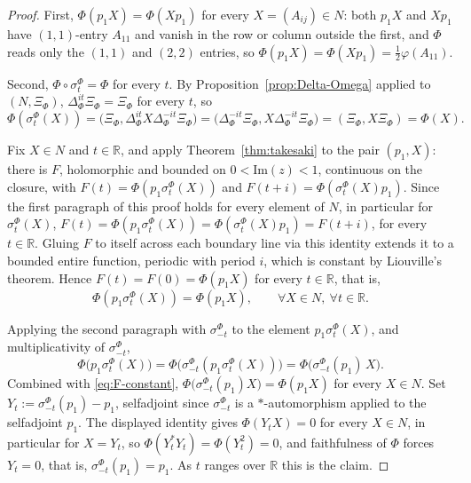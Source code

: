 \begin{proof}
	First, $\Phi(p_1X) = \Phi(Xp_1)$ for every $X=(A_{ij}) \in N$: both $p_1X$ and $Xp_1$ have $(1,1)$-entry $A_{11}$ and vanish in the row or column outside the first, and $\Phi$ reads only the $(1,1)$ and $(2,2)$ entries, so $\Phi(p_1X)=\Phi(Xp_1)=\tfrac12\varphi(A_{11})$.
	
	Second, $\Phi \circ \sigma_t^\Phi = \Phi$ for every $t$. By Proposition~\ref{prop:Delta-Omega} applied to $(N,\Xi_\Phi)$, $\Delta_\Phi^{it}\Xi_\Phi = \Xi_\Phi$ for every $t$, so
	\[
	\Phi(\sigma_t^\Phi(X)) = \big(\Xi_\Phi, \Delta_\Phi^{it}X\Delta_\Phi^{-it}\Xi_\Phi\big) = \big(\Delta_\Phi^{-it}\Xi_\Phi, X\Delta_\Phi^{-it}\Xi_\Phi\big) = (\Xi_\Phi,X\Xi_\Phi) = \Phi(X).
	\]
	
	Fix $X \in N$ and $t \in \mathbb{R}$, and apply Theorem~\ref{thm:takesaki} to the pair $(p_1,X)$: there is $F$, holomorphic and bounded on $0<\mathrm{Im}(z)<1$, continuous on the closure, with $F(t) = \Phi(p_1\sigma_t^\Phi(X))$ and $F(t+i) = \Phi(\sigma_t^\Phi(X)p_1)$. Since the first paragraph of this proof holds for every element of $N$, in particular for $\sigma_t^\Phi(X)$, $F(t) = \Phi(p_1\sigma_t^\Phi(X)) = \Phi(\sigma_t^\Phi(X)p_1) = F(t+i)$, for every $t \in \mathbb{R}$. Gluing $F$ to itself across each boundary line via this identity extends it to a bounded entire function, periodic with period $i$, which is constant by Liouville's theorem. Hence $F(t) = F(0) = \Phi(p_1X)$ for every $t \in \mathbb{R}$, that is,
	\begin{equation}\label{eq:F-constant}
		\Phi(p_1\sigma_t^\Phi(X)) = \Phi(p_1X), \qquad \forall X \in N, \ \forall t \in \mathbb{R}.
	\end{equation}
	
	Applying the second paragraph with $\sigma_{-t}^\Phi$ to the element $p_1\sigma_t^\Phi(X)$, and multiplicativity of $\sigma_{-t}^\Phi$,
	\[
	\Phi\big(p_1\sigma_t^\Phi(X)\big) = \Phi\big(\sigma_{-t}^\Phi(p_1\sigma_t^\Phi(X))\big) = \Phi\big(\sigma_{-t}^\Phi(p_1)\,X\big).
	\]
	Combined with \eqref{eq:F-constant}, $\Phi\big(\sigma_{-t}^\Phi(p_1)X\big) = \Phi(p_1X)$ for every $X \in N$. Set $Y_t := \sigma_{-t}^\Phi(p_1) - p_1$, selfadjoint since $\sigma_{-t}^\Phi$ is a $*$-automorphism applied to the selfadjoint $p_1$. The displayed identity gives $\Phi(Y_tX)=0$ for every $X \in N$, in particular for $X=Y_t$, so $\Phi(Y_t^*Y_t) = \Phi(Y_t^2) = 0$, and faithfulness of $\Phi$ forces $Y_t=0$, that is, $\sigma_{-t}^\Phi(p_1)=p_1$. As $t$ ranges over $\mathbb{R}$ this is the claim.
\end{proof}

